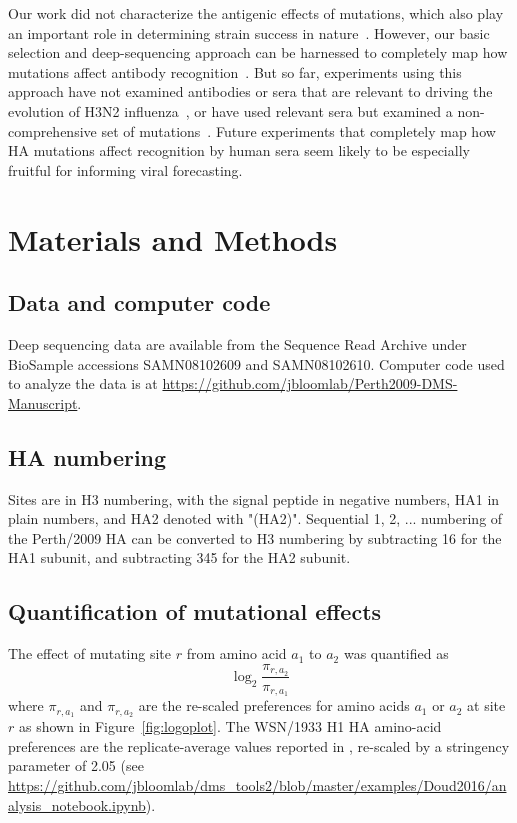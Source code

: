 Our work did not characterize the antigenic effects of mutations, which also play an important role in determining strain success in nature~\citep{Koel:2013jz,Neher:2016hy}.
However, our basic selection and deep-sequencing approach can be harnessed to completely map how mutations affect antibody recognition~\citep{Doud:2017bw,doud2018quantifying}.
But so far, experiments using this approach have not examined antibodies or sera that are relevant to driving the evolution of H3N2 influenza~\citep{Doud:2017bw,doud2018quantifying}, or have used relevant sera but examined a non-comprehensive set of mutations~\citep{li2016selection}.
Future experiments that completely map how HA mutations affect recognition by human sera seem likely to be especially fruitful for informing viral forecasting.

\section{Materials and Methods}

\subsection*{Data and computer code}
Deep sequencing data are available from the Sequence Read Archive under BioSample accessions SAMN08102609 and SAMN08102610.
Computer code used to analyze the data is at \url{https://github.com/jbloomlab/Perth2009-DMS-Manuscript}.

\subsection*{HA numbering}
Sites are in H3 numbering, with the signal peptide in negative numbers, HA1 in plain numbers, and HA2 denoted with "(HA2)". Sequential 1, 2, ... numbering of the Perth/2009 HA can be converted to H3 numbering by subtracting 16 for the HA1 subunit, and subtracting 345 for the HA2 subunit.

\subsection*{Quantification of mutational effects}
The effect of mutating site $r$ from amino acid $a_1$ to $a_2$ was quantified as
\begin{equation}
\label{eq:muteffect}
\log_2 \frac{\pi_{r,a_2}}{\pi_{r,a_1}}
\end{equation}
where $\pi_{r,a_1}$ and $\pi_{r,a_2}$ are the re-scaled preferences for amino acids $a_1$ or $a_2$ at site $r$ as shown in Figure~\ref{fig:logoplot}.
The WSN/1933 H1 HA amino-acid preferences are the replicate-average values reported in \citep{Doud:2016gm}, re-scaled by a stringency parameter of 2.05 (see \url{https://github.com/jbloomlab/dms_tools2/blob/master/examples/Doud2016/analysis_notebook.ipynb}).

